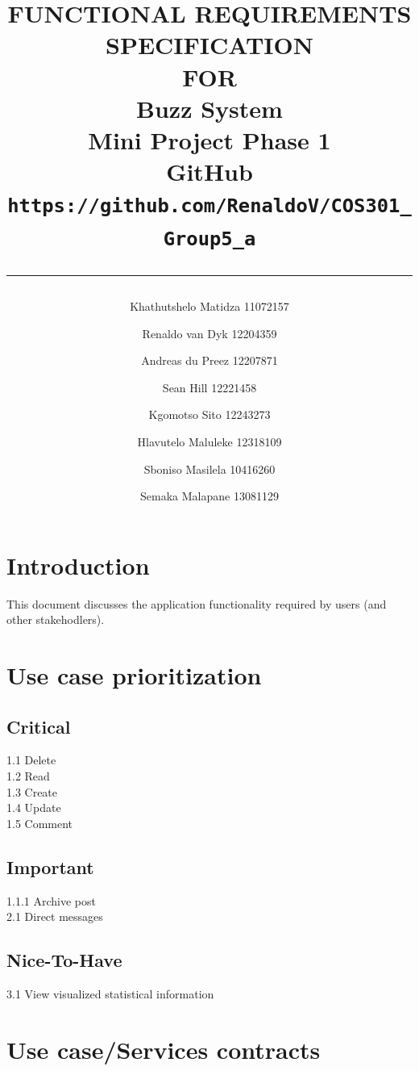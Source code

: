\documentclass{scrreprt}
\title{%
\author{
Khathutshelo Matidza 11072157\\
\and
Renaldo van Dyk 12204359\\
\and
Andreas du Preez 12207871\\
\and
Sean Hill 12221458\\
\and
Kgomotso Sito 12243273\\
\and
Hlavutelo Maluleke 12318109\\
\and
Sboniso Masilela 10416260\\
\and
Semaka Malapane 13081129\\
}
\centering
\Huge{FUNCTIONAL REQUIREMENTS\\ SPECIFICATION}\\
\vspace{2cm}
FOR\\
\vspace{2cm}
Buzz System\\
\vspace{2cm}
Mini Project Phase 1\\
GitHub\\
\LARGE\texttt{https://github.com/RenaldoV/COS301\_Group5\_a}
\vfill
\vspace{1cm}
\rule{15cm}{3pt}
}
\date{}
\begin{document}
\maketitle
\tableofcontents
\chapter{ Introduction}
This document discusses the application functionality required by users (and other stakehodlers).\\
\chapter{ Use case prioritization}
\section{Critical}
1.1 Delete\\
1.2 Read\\
1.3 Create\\
1.4 Update\\
1.5 Comment\\
\section{Important}
1.1.1 Archive post\\
2.1 Direct messages\\
\section{Nice-To-Have}
3.1 View visualized statistical information\\
\chapter{Use case/Services contracts}
\end{document}
